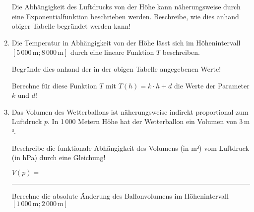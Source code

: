 \begin{langesbeispiel}
\begin{enumerate}
	Die Abhängigkeit des Luftdrucks von der Höhe kann näherungsweise durch eine Exponentialfunktion beschrieben werden. Beschreibe, wie dies anhand obiger Tabelle begründet werden kann!
	
	\item Die Temperatur in Abhängigkeit von der Höhe lässt sich im Höhenintervall $[5\,000\,\text{m}; 8\,000\,\text{m}]$ durch eine lineare Funktion $T$ beschreiben.\leer
	
	Begründe dies anhand der in der obigen Tabelle angegebenen Werte!\leer
	
	Berechne für diese Funktion $T$ mit $T(h)=k\cdot h+d$ die Werte der Parameter $k$ und $d$!
	
	\item Das Volumen des Wetterballons ist näherungsweise indirekt proportional zum Luftdruck $p$. In 1\,000 Metern Höhe hat der Wetterballon ein Volumen von 3\,m$³$.
	
	Beschreibe die funktionale Abhängigkeit des Volumens (in m$³$) vom Luftdruck (in hPa) durch eine Gleichung!
	
	$V(p)=$ \rule{5cm}{0.3pt}
	
	Berechne die absolute Änderung des Ballonvolumens im Höhenintervall $[1\,000\,\text{m}; 2\,000\,\text{m}]$
						\end{enumerate}\leer
				
\end{langesbeispiel}
